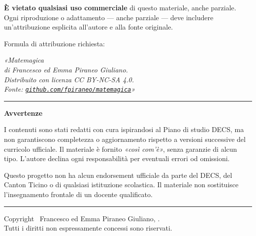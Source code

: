 {    \medskip

    \noindent\textbf{È vietato qualsiasi uso commerciale} di questo materiale, anche parziale.
    Ogni riproduzione o adattamento — anche parziale — deve includere
    un'attribuzione esplicita all'autore e alla fonte originale.

    \medskip

    \noindent Formula di attribuzione richiesta:

    \smallskip
    \begin{center}
        \textit{«Matemagica\\
            di Francesco ed Emma Piraneo Giuliano.\\
            Distribuito con licenza CC BY-NC-SA 4.0.\\
            Fonte: \href{https://github.com/fpiraneo/matemagica}{\texttt{github.com/fpiraneo/matemagica}}»}
    \end{center}

    \medskip
    \noindent\rule{\linewidth}{0.4pt}
    \medskip

    \noindent\textbf{Avvertenze}

    \smallskip
    \noindent I contenuti sono stati redatti con cura ispirandosi al Piano di studio DECS,
    ma non garantiscono completezza o aggiornamento rispetto a versioni successive
    del curricolo ufficiale. Il materiale è fornito \textit{«così com'è»}, senza garanzie
    di alcun tipo. L'autore declina ogni responsabilità per eventuali errori od omissioni.

    \smallskip
    \noindent Questo progetto non ha alcun endorsement ufficiale da parte del DECS,
    del Canton Ticino o di qualsiasi istituzione scolastica.
    Il materiale non sostituisce l'insegnamento frontale di un docente qualificato.

    \medskip
    \noindent\rule{\linewidth}{0.4pt}
    \medskip

    \begin{center}
        {\footnotesize Copyright \textcopyright\ Francesco ed Emma Piraneo Giuliano, \the\year.\\
            Tutti i diritti non espressamente concessi sono riservati.}
    \end{center}

} %

\vspace*{\fill}